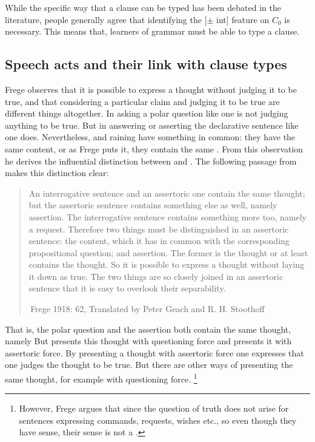 While the specific way that a clause can be typed has been debated in the literature, people generally agree that identifying the [$\pm$ int] feature on $C_{0}$ is necessary. This means that, learners of grammar must be able to type a clause. %


\subsection{Speech acts and their link with clause types} \label{sec:bg:theory:speech}
Frege observes that it is possible to express a thought without judging it to be true, and that considering a particular claim and judging it to be true are different things altogether. In asking a polar question like one is not judging anything to be true. But in answering or asserting the declarative sentence like  one does. Nevertheless,  and  raining have something in common: they have the same content, or as Frege puts it, they contain the same . From this observation he derives the influential distinction between  and . The following passage from  makes this distinction clear:

\begin{quote}
    

An interrogative sentence and an assertoric one contain the same thought; but the assertoric sentence contains something else as well, namely assertion. The interrogative sentence contains something more too, namely a request. Therefore two things must be distinguished in an assertoric sentence: the content, which it has in common with the corresponding propositional question; and assertion. The former is the thought or at least contains the thought. So it is possible to express a thought without laying it down as true. The two things are so closely joined in an assertoric sentence that it is easy to overlook their separability. 

$\,$\hfill Frege 1918: 62, Translated by Peter Geach and R. H. Stoothoff
\end{quote}

That is, the polar question  and the assertion  both contain the same thought, namely   But  presents this thought with questioning force and  presents it with assertoric force. By presenting a thought with assertoric force one expresses that one judges the thought to be true. But there are other ways of presenting the same thought, for example with questioning force. \footnote{However, Frege argues that since the question of truth does not arise for sentences expressing commands, requests, wishes etc., so even though they have sense, their sense is not a .}

